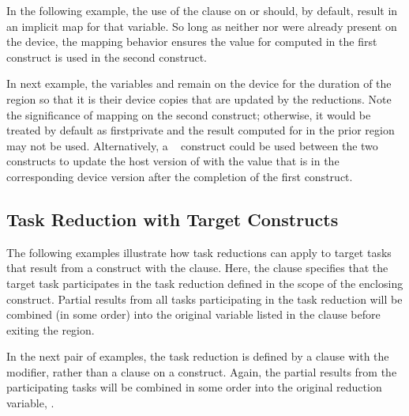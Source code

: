 In the following example, the use of the  clause on 
or  should, by default, result in an implicit  map for
that variable. So long as neither  nor  were already
present on the device, the mapping behavior ensures the value for
 computed in the first  construct is used in the
second  construct.


\clearpage

In next example,  the variables  and  remain on the
device for the duration of the ~ region so that it is
their device copies that are updated by the reductions. Note the significance
of mapping  on the second  construct; otherwise, it
would be treated by default as firstprivate and the result computed for
 in the prior  region may not be used. Alternatively, a
~ construct could be used between the two
 constructs to update the host version of  with the
value that is in the corresponding device version after the completion of the
first construct.




\subsection{Task Reduction with Target Constructs}
\label{subsec:target_task_reduction}

The following examples illustrate how task reductions can apply to target tasks
that result from a  construct with the 
clause. Here, the  clause specifies that the target task
participates in the task reduction defined in the scope of the enclosing
 construct. Partial results from all tasks participating in the
task reduction will be combined (in some order) into the original variable
listed in the  clause before exiting the 
region. 



In the next pair of examples, the task reduction is defined by a
 clause with the  modifier, rather than a
 clause on a  construct. Again, the
partial results from the participating tasks will be combined in some order
into the original reduction variable, .

